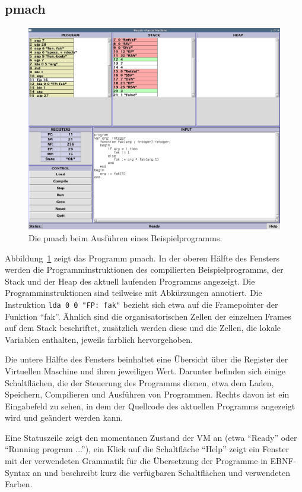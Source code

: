 \documentclass[german, a4paper, parskip, bibliography=totoc]{scrartcl}
\begin{document}
\subsection{pmach}
\begin{figure}[htb]
    \centering
    \includegraphics[width=\textwidth]{screenshot_old_pmach.png}
    \caption{Die pmach beim Ausführen eines Beispielprogramms.}
    \label{img_gofer_pmach}
\end{figure}

Abbildung~\ref{img_gofer_pmach} zeigt das Programm pmach. In der oberen Hälfte
des Fensters werden die Programminstruktionen des compilierten
Beispielprogramms, der Stack und der Heap des aktuell laufenden Programms
angezeigt. Die Programminstruktionen sind teilweise mit Abkürzungen annotiert.
Die Instruktion \texttt{lda 0 0 "FP: fak"} bezieht sich etwa auf die
Framepointer der Funktion \enquote{fak}. Ähnlich sind die organisatorischen
Zellen der einzelnen Frames auf dem Stack beschriftet, zusätzlich werden diese
und die Zellen, die lokale Variablen enthalten, jeweils farblich hervorgehoben.

Die untere Hälfte des Fensters beinhaltet eine Übersicht über die Register
der Virtuellen Maschine und ihren jeweiligen Wert. Darunter befinden sich
einige Schaltflächen, die der Steuerung des Programms dienen, etwa dem Laden,
Speichern, Compilieren und Ausführen von Programmen. Rechts davon ist ein
Eingabefeld zu sehen, in dem der Quellcode des aktuellen Programms angezeigt
wird und geändert werden kann.

Eine Statuszeile zeigt den momentanen Zustand der VM an (etwa \enquote{Ready}
oder \enquote{Running program ...}), ein Klick auf die Schaltfläche
\enquote{Help} zeigt ein Fenster mit der verwendeten Grammatik für die
Übersetzung der Programme in EBNF-Syntax an und beschreibt kurz die verfügbaren
Schaltflächen und verwendeten Farben.
\end{document}
